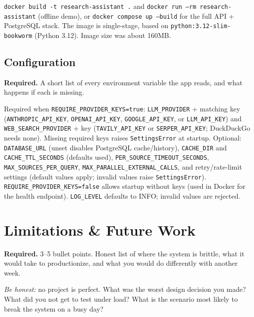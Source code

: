 \documentclass[11pt,a4paper]{article}
\begin{document}
\texttt{docker build -t research-assistant .} and \texttt{docker run --rm research-assistant} (offline demo), or \texttt{docker compose up --build} for the full API + PostgreSQL stack. The image is single-stage, based on \texttt{python:3.12-slim-bookworm} (Python 3.12). Image size was about 160MB.

\subsection{Configuration}

\begin{deliverbox}
\textbf{Required.} A short list of every environment variable the app reads, and what happens if each is missing.
\end{deliverbox}

Required when \texttt{REQUIRE\_PROVIDER\_KEYS=true}: \texttt{LLM\_PROVIDER} + matching key (\texttt{ANTHROPIC\_API\_KEY}, \texttt{OPENAI\_API\_KEY}, \texttt{GOOGLE\_API\_KEY}, or \texttt{LLM\_API\_KEY}) and \texttt{WEB\_SEARCH\_PROVIDER} + key (\texttt{TAVILY\_API\_KEY} or \texttt{SERPER\_API\_KEY}; DuckDuckGo needs none). Missing required keys raises \texttt{SettingsError} at startup. Optional: \texttt{DATABASE\_URL} (unset disables PostgreSQL cache/history), \texttt{CACHE\_DIR} and \texttt{CACHE\_TTL\_SECONDS} (defaults used), \texttt{PER\_SOURCE\_TIMEOUT\_SECONDS}, \texttt{MAX\_SOURCES\_PER\_QUERY}, \texttt{MAX\_PARALLEL\_EXTERNAL\_CALLS}, and retry/rate-limit settings (default values apply; invalid values raise \texttt{SettingsError}). \texttt{REQUIRE\_PROVIDER\_KEYS=false} allows startup without keys (used in Docker for the health endpoint). \texttt{LOG\_LEVEL} defaults to INFO; invalid values are rejected.

\section{Limitations \& Future Work}\label{sec:limits}

\begin{deliverbox}
\textbf{Required.} 3--5 bullet points. Honest list of where the system is brittle, what it would take to productionize, and what you would do differently with another week.
\end{deliverbox}

\begin{probebox}
\textit{Be honest:} no project is perfect. What was the worst design decision you made? What did you not get to test under load? What is the scenario most likely to break the system on a busy day?
\end{probebox}
\end{document}
